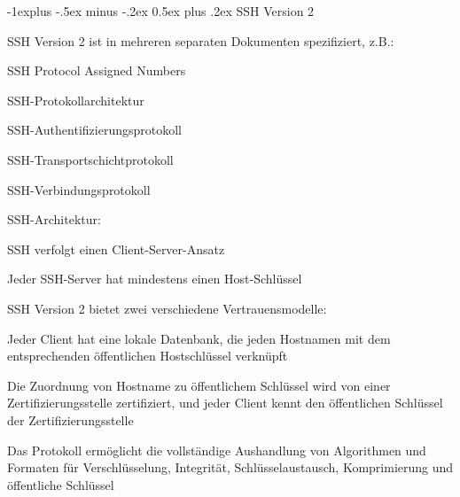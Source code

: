 \documentclass[a4paper]{article}
\makeatletter
\renewcommand{\subsection}{\@startsection{subsection}{2}{0mm}%
 {-1explus -.5ex minus -.2ex}%
 {0.5ex plus .2ex}%
 {\normalfont\normalsize\bfseries}}
\makeatother
\begin{document}
\begin{multicols}{3}
      \subsection{SSH Version 2}
      \begin{itemize*}
            \item SSH Version 2 ist in mehreren separaten Dokumenten spezifiziert, z.B.:
            \begin{itemize*}
                  \item SSH Protocol Assigned Numbers
                  \item SSH-Protokollarchitektur
                  \item SSH-Authentifizierungsprotokoll
                  \item SSH-Transportschichtprotokoll
                  \item SSH-Verbindungsprotokoll
            \end{itemize*}
            \item SSH-Architektur:
            \begin{itemize*}
                  \item SSH verfolgt einen Client-Server-Ansatz
                  \item Jeder SSH-Server hat mindestens einen Host-Schlüssel
                  \item SSH Version 2 bietet zwei verschiedene Vertrauensmodelle:
                  \begin{itemize*}
                        \item Jeder Client hat eine lokale Datenbank, die jeden Hostnamen mit dem entsprechenden öffentlichen Hostschlüssel verknüpft
                        \item Die Zuordnung von Hostname zu öffentlichem Schlüssel wird von einer Zertifizierungsstelle zertifiziert, und jeder Client kennt den öffentlichen Schlüssel der Zertifizierungsstelle
                  \end{itemize*}
                  \item Das Protokoll ermöglicht die vollständige Aushandlung von Algorithmen und Formaten für Verschlüsselung, Integrität, Schlüsselaustausch, Komprimierung und öffentliche Schlüssel
            \end{itemize*}
      \end{itemize*}


\end{multicols}
\end{document}
